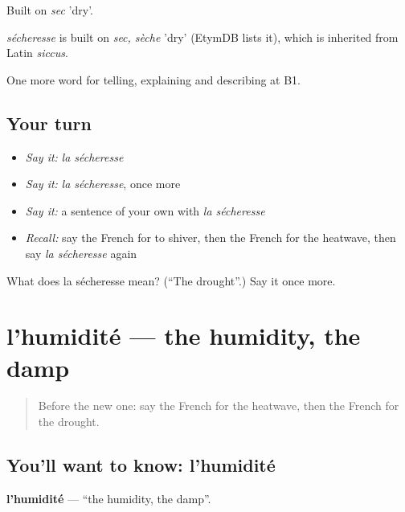 Built on \emph{sec} 'dry'.

\begin{cousinweb}
\emph{sécheresse} is built on \emph{sec, sèche} 'dry' (EtymDB lists it), which is inherited from Latin \emph{siccus}.
\end{cousinweb}

\begin{grammarlens}[title={What you've built}]
One more word for telling, explaining and describing at B1.
\end{grammarlens}

\subsection*{Your turn}
\begin{itemize}
\raggedright
  \item \emph{Say it:} \emph{la sécheresse}
  \item \emph{Say it:} \emph{la sécheresse}, once more
  \item \emph{Say it:} a sentence of your own with \emph{la sécheresse}
  \item \emph{Recall:} say the French for to shiver, then the French for the heatwave, then say \emph{la sécheresse} again
\end{itemize}

\begin{tcolorbox}[breakable,colback=teal!4,colframe=teal!35!black,title={Before you move on}]
What does la sécheresse mean? (\textquotedblleft{}The drought\textquotedblright{}.) Say it once more.
\end{tcolorbox}
\section[l'humidité]{l'humidité — the humidity, the damp}

\label{lesson:FR-C464-humidite}



\begin{quote}
Before the new one: say the French for the heatwave, then the French for the drought.
\end{quote}

\subsection*{You'll want to know: l'humidité}
\textbf{l'humidité} — \textquotedblleft{}the humidity, the damp\textquotedblright{}.

